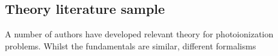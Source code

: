 \subsection{Theory literature sample\label{sec:theory-lit}}

A number of authors have developed relevant theory for photoionization problems. Whilst the fundamentals are similar, different formalisms 